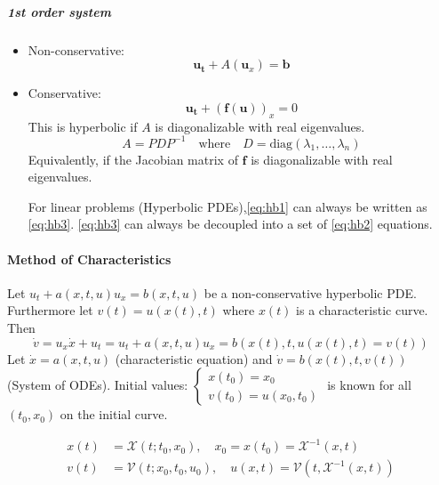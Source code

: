 \subparagraph{1st order system}
\begin{itemize}
  \item Non-conservative:
        \[
          \label{eq:hb3}
          \symbf{u_t} + A(\symbf{u}_x) = \symbf{b}\tag{3}
        \]
  \item Conservative: \[\symbf{u_t} + (\symbf{f}(\symbf{u}))_x = 0\]
        This is hyperbolic if \(A\) is diagonalizable with real eigenvalues.
        \[
          A = PDP^{-1} \quad \text{where} \quad D = \text{diag}(\lambda_1, \ldots, \lambda_n)
        \]
        Equivalently, if the Jacobian matrix of \(\symbf{f}\) is diagonalizable with real eigenvalues.

        For linear problems (Hyperbolic PDEs),\eqref{eq:hb1} can always be written as \eqref{eq:hb3}.
        \eqref{eq:hb3} can always be decoupled into a set of \eqref{eq:hb2} equations.
\end{itemize}
\paragraph{Method of Characteristics}
Let \(u_t + a(x,t,u)u_x = b(x,t,u)\) be a non-conservative hyperbolic PDE. Furthermore let \(v(t) = u(x(t), t)\) where \(x(t)\) is a characteristic curve. Then
\[
  \dot{v} = u_x \dot{x} + u_t = u_t + a(x,t,u)u_x = b(x(t), t, u(x(t), t)=v(t))
\]
Let \(\dot{x} = a(x,t,u)\) (characteristic equation) and \(\dot{v} = b(x(t), t, v(t))\) (System of ODEs).
Initial values: \(\begin{cases} x(t_0) = x_0 \\ v(t_0) = u(x_0, t_0) \end{cases}\) is known for all \((t_0, x_0)\) on the initial curve.

\begin{align*}
  x(t) & = \mathcal{X}(t; t_0, x_0), \quad x_0 = x(t_0) = \mathcal{X}^{-1}(x, t)               \\
  v(t) & = \mathcal{V}(t; x_0, t_0, u_0), \quad u(x,t) = \mathcal{V}(t, \mathcal{X}^{-1}(x,t))
\end{align*}


